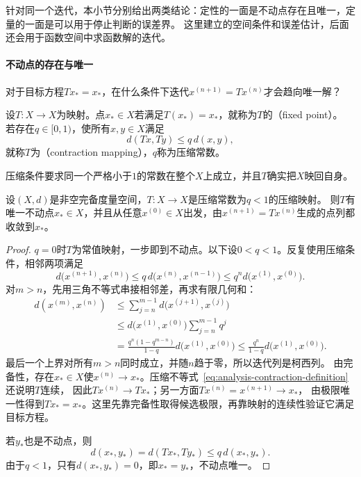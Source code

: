 针对同一个迭代，本小节分别给出两类结论：定性的一面是不动点存在且唯一，定量的一面是可以用于停止判断的误差界。
这里建立的空间条件和误差估计，后面还会用于函数空间中求函数解的迭代。

\paragraph{不动点的存在与唯一}

对于目标方程$Tx_*=x_*$，在什么条件下迭代$x^{(n+1)}=Tx^{(n)}$才会趋向唯一解？

\begin{definition}[不动点与压缩映射]
\label{def:analysis-fixed-point}
设$T:X\to X$为映射。点$x_*\in X$若满足$T(x_*)=x_*$，就称为$T$的（fixed point）。
若存在$q\in[0,1)$，使所有$x,y\in X$满足
\begin{equation}
\label{eq:analysis-contraction-definition}
  d(Tx,Ty)\leq q\,d(x,y),
\end{equation}
就称$T$为（contraction mapping），$q$称为压缩常数。
\end{definition}

压缩条件要求同一个严格小于$1$的常数在整个$X$上成立，并且$T$确实把$X$映回自身。

\begin{theorem}[Banach压缩映射定理]
\label{thm:analysis-banach-fixed-point}
设$(X,d)$是非空完备度量空间，$T:X\to X$是压缩常数为$q<1$的压缩映射。
则$T$有唯一不动点$x_*\in X$，并且从任意$x^{(0)}\in X$出发，由$x^{(n+1)}=Tx^{(n)}$生成的点列都收敛到$x_*$。
\end{theorem}

\begin{proof}
$q=0$时$T$为常值映射，一步即到不动点。以下设$0<q<1$。反复使用压缩条件，相邻两项满足
\[
  d\bigl(x^{(n+1)},x^{(n)}\bigr)
  \leq q\,d\bigl(x^{(n)},x^{(n-1)}\bigr)
  \leq q^n d\bigl(x^{(1)},x^{(0)}\bigr).
\]
对$m>n$，先用三角不等式串接相邻差，再求有限几何和：
\begin{align*}
  d(x^{(m)},x^{(n)})
  &\leq\sum_{j=n}^{m-1}d\bigl(x^{(j+1)},x^{(j)}\bigr)\\
  &\leq d\bigl(x^{(1)},x^{(0)}\bigr)\sum_{j=n}^{m-1}q^j\\
  &=\frac{q^n(1-q^{m-n})}{1-q}d\bigl(x^{(1)},x^{(0)}\bigr)
  \leq\frac{q^n}{1-q}d\bigl(x^{(1)},x^{(0)}\bigr).
\end{align*}
最后一个上界对所有$m>n$同时成立，并随$n$趋于零，所以迭代列是柯西列。
由完备性，存在$x_*\in X$使$x^{(n)}\to x_*$。压缩不等式~\eqref{eq:analysis-contraction-definition}还说明$T$连续，
因此$Tx^{(n)}\to Tx_*$；另一方面$Tx^{(n)}=x^{(n+1)}\to x_*$，
由极限唯一性得到$Tx_*=x_*$。这里先靠完备性取得候选极限，再靠映射的连续性验证它满足目标方程。

若$y_*$也是不动点，则
\[
  d(x_*,y_*)=d(Tx_*,Ty_*)\leq q\,d(x_*,y_*).
\]
由于$q<1$，只有$d(x_*,y_*)=0$，即$x_*=y_*$，不动点唯一。
\end{proof}


